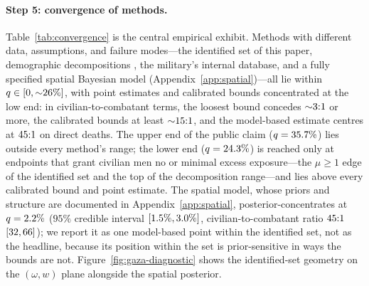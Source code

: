 \paragraph{Step 5: convergence of methods.} Table~\ref{tab:convergence} is the central empirical exhibit. Methods with different data, assumptions, and failure modes---the identified set of this paper, demographic decompositions \citep{cockerill2024,frost2026}, the military's internal database, and a fully specified spatial Bayesian model (Appendix~\ref{app:spatial})---all lie within $q\in[0,{\sim}26{}\%]$, with point estimates and calibrated bounds concentrated at the low end: in civilian-to-combatant terms, the loosest bound concedes ${\sim}3{}{:}1$ or more, the calibrated bounds at least ${\sim}15{}{:}1$, and the model-based estimate centres at $45{}{:}1$ on direct deaths. The upper end of the public claim ($q=35.7{}\%$) lies outside every method's range; the lower end ($q=24.3{}\%$) is reached only at endpoints that grant civilian men no or minimal excess exposure---the $\mu\ge 1$ edge of the identified set and the top of the decomposition range---and lies above every calibrated bound and point estimate. The spatial model, whose priors and structure are documented in Appendix~\ref{app:spatial}, posterior-concentrates at $q=2.2{}\%$ ($95\%$ credible interval $[1.5{}\%,3.0{}\%]$, civilian-to-combatant ratio $45{}{:}1$ $[32{},66{}]$); we report it as one model-based point within the identified set, not as the headline, because its position within the set is prior-sensitive in ways the bounds are not. Figure~\ref{fig:gaza-diagnostic} shows the identified-set geometry on the $(\omega,w)$ plane alongside the spatial posterior.



